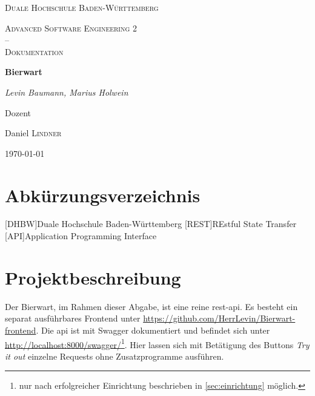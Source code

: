 \documentclass[12pt,a4paper,titlepage,ngerman,pdftex]{report}
\begin{document}
    \begin{titlepage}
        \centering
        {\scshape\LARGE Duale Hochschule Baden-Württemberg \par}
        \vspace{1cm}
        {\scshape\Large Advanced Software Engineering 2 \\--\\ Dokumentation\par}
        \vspace{1.5cm}
        {\huge\bfseries Bierwart\par}
        \vspace{2cm}
        {\Large\itshape Levin Baumann, Marius Holwein\par}
        \vfill
        Dozent\par
        Daniel \textsc{Lindner}

        \vfill

        {\large \today\par}
    \end{titlepage}

    \tableofcontents
    \listoffigures
    \lstlistoflistings

    \chapter*{Abkürzungsverzeichnis}
    \begin{acronym}[all]
        [DHBW]{Duale Hochschule Baden-Württemberg}
        [REST]{REstful State Transfer}
        [API]{Application Programming Interface}
    \end{acronym}
    \onehalfspacing

    \chapter{Projektbeschreibung}\label{ch:projektbeschreibung}
    Der Bierwart, im Rahmen dieser Abgabe, ist eine reine \ac{rest}-\ac{api}. Es besteht ein separat ausführbares Frontend unter \url{https://github.com/HerrLevin/Bierwart-frontend}.
    Die \ac{api} ist mit Swagger dokumentiert und befindet sich unter \url{http://localhost:8000/swagger/}\footnote{nur nach erfolgreicher Einrichtung beschrieben in \ref{sec:einrichtung} möglich.}.
    Hier lassen sich mit Betätigung des Buttons \textit{Try it out} einzelne Requests ohne Zusatzprogramme ausführen.
\end{document}
